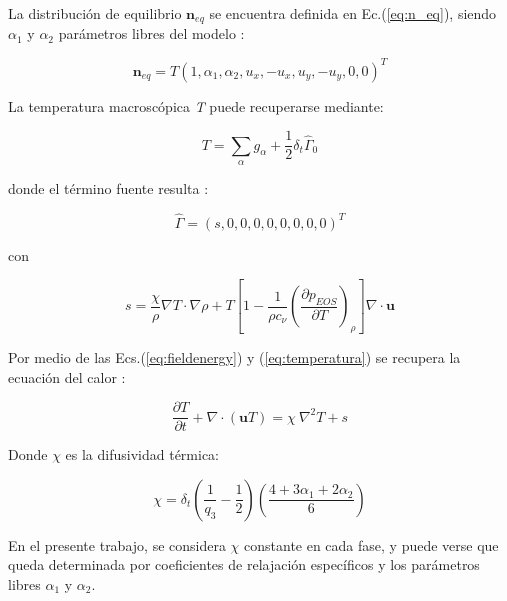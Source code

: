 La distribución de equilibrio $\mathbf{n}_{eq}$ se encuentra definida en Ec.(\ref{eq:n_eq}), siendo $\alpha_{1}$ y $\alpha_{2}$ parámetros libres del modelo :

\begin{equation}
    {\mathbf{n}}_{eq} = T { \left( 1, \alpha_{1}, \alpha_{2}, u_{x}, -u_{x}, u_{y}, -u_{y}, 0, 0 \right) }^{T}
    \label{eq:n_eq}
\end{equation}

La temperatura macroscópica \textit{T} puede recuperarse mediante:

\begin{equation}
T = \sum_{\alpha} g_{\alpha} + \frac{1}{2} \delta_{t} {\hat{\Gamma}}_{0}
\label{eq:temperatura}
\end{equation}



donde el término fuente resulta :


\begin{equation}
    \hat{\Gamma} = {( s, 0, 0, 0, 0, 0, 0, 0, 0 )}^{T}
\end{equation}

con 

\begin{equation}
    s = \frac{\chi}{\rho} \nabla T \cdot \nabla \rho + T \left[ 1 - \frac{1}{\rho c_{\nu}} {\left( \frac{\partial p_{EOS}}{\partial T} \right)}_{\rho} \right] \nabla \cdot \mathbf{u}
    \label{eq:s_chica}
\end{equation}

Por medio de las  Ecs.(\ref{eq:fieldenergy}) y (\ref{eq:temperatura}) se recupera la ecuación del calor \cite{markus2011simulation}:

\begin{equation}
    \frac{\partial T}{\partial t} + \nabla \cdot ( \mathbf{u} T ) = \chi \> {\nabla }^{2} T + s
\end{equation}

Donde $\chi$ es la difusividad térmica:

\begin{equation}
\chi = \delta_{t} \left( \frac{1}{q_{3}} - \frac{1}{2} \right) \left( \frac{ 4 + 3 \alpha_{1} + 2 \alpha_{2}}{6} \right)
\label{eq:chi}
\end{equation}

En el presente trabajo, se considera $\chi$ constante en cada fase, y puede verse que queda determinada por coeficientes de relajación específicos y los parámetros libres $\alpha_{1}$ y $\alpha_{2}$.


